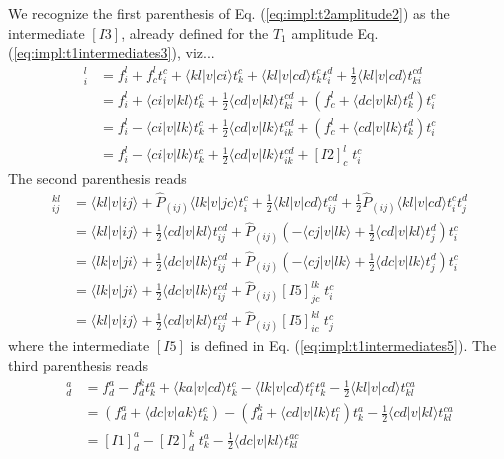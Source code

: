 We recognize the first parenthesis of Eq. (\ref{eq:impl:t2amplitude2}) as the intermediate $[I3]$, already defined for the $\hat{T}_1$ amplitude Eq. (\ref{eq:impl:t1intermediates3}), viz...
\begin{align}
[I3]_{i}^{l} &= f_i^l + f_c^lt_i^c + \langle kl|v|ci\rangle t_k^c + \langle kl|v|cd\rangle t_k^ct_i^d+\frac{1}{2}\langle kl|v|cd\rangle t_{ki}^{cd}\nonumber\\
&=f_i^l+\langle ci|v|kl\rangle t_k^c+\frac{1}{2}\langle cd|v|kl\rangle t_{ki}^{cd}+(f_c^l+\langle dc|v|kl\rangle t_k^d)t_i^c\nonumber\\
&=f_i^l-\langle ci|v|lk\rangle t_k^c+\frac{1}{2}\langle cd|v|lk\rangle t_{ik}^{cd}+(f_c^l+\langle cd|v|lk\rangle t_k^d)t_i^c\nonumber\\
&=f_i^l-\langle ci|v|lk\rangle t_k^c+\frac{1}{2}\langle cd|v|lk\rangle t_{ik}^{cd}+[I2]_c^l\phantom{.}t_i^c
\label{eq:impl:t2intermediates3}
\end{align}
The second parenthesis reads
\begin{align}
[I6]_{ij}^{kl} &= \langle kl|v|ij\rangle +\hat{P}_{(ij)}\langle lk|v|jc\rangle t_i^c+\frac{1}{2}\langle kl|v|cd\rangle t_{ij}^{cd}+\frac{1}{2}\hat{P}_{(ij)}\langle kl|v|cd\rangle t_i^ct_j^d\nonumber\\
&=\langle kl|v|ij\rangle+\frac{1}{2}\langle cd|v|kl\rangle t_{ij}^{cd}+\hat{P}_{(ij)}\left(-\langle cj|v|lk\rangle+\frac{1}{2}\langle cd|v|kl\rangle t_j^d \right)t_i^c\nonumber\\
&=\langle lk|v|ji\rangle+\frac{1}{2}\langle dc|v|lk\rangle t_{ij}^{cd}+\hat{P}_{(ij)}\left(-\langle cj|v|lk\rangle+\frac{1}{2}\langle dc|v|lk\rangle t_j^d \right)t_i^c\nonumber\\
&=\langle lk|v|ji\rangle+\frac{1}{2}\langle dc|v|lk\rangle t_{ij}^{cd}+\hat{P}_{(ij)}[I5]_{jc}^{lk}\phantom{.}t_i^c\nonumber\\
&=\langle kl|v|ij\rangle+\frac{1}{2}\langle cd|v|kl\rangle t_{ij}^{cd}+\hat{P}_{(ij)}[I5]_{ic}^{kl}\phantom{.}t_j^c
\label{eq:impl:t2intermediates6}
\end{align}
where the intermediate $[I5]$ is defined in Eq. (\ref{eq:impl:t1intermediates5}). The third parenthesis reads
\begin{align}
[I7]_{d}^{a} &= f_d^a-f_d^kt_k^a+\langle ka|v|cd\rangle t_k^c-\langle lk|v|cd\rangle t_l^ct_k^a-\frac{1}{2}\langle kl|v|cd\rangle t_{kl}^{ca}\nonumber\\
&=\left(f_d^a +\langle dc|v|ak\rangle t_k^c\right)-\left(f_d^k+\langle cd|v|lk\rangle t_l^c\right)t_k^a-\frac{1}{2}\langle cd|v|kl\rangle t_{kl}^{ca}\nonumber\\
&=[I1]_d^a-[I2]_d^k\phantom{.}t_k^a-\frac{1}{2}\langle dc|v|kl\rangle t_{kl}^{ac}
\label{eq:impl:t2intermediates7}
\end{align}
